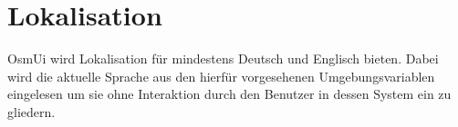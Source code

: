 \documentclass[a4paper,10pt]{scrartcl}
\begin{document}
\section{Lokalisation}
OsmUi wird Lokalisation für mindestens Deutsch und Englisch bieten. Dabei wird die aktuelle Sprache aus den hierfür vorgesehenen Umgebungsvariablen eingelesen um
sie ohne Interaktion durch den Benutzer in dessen System ein zu gliedern.
\end{document}
